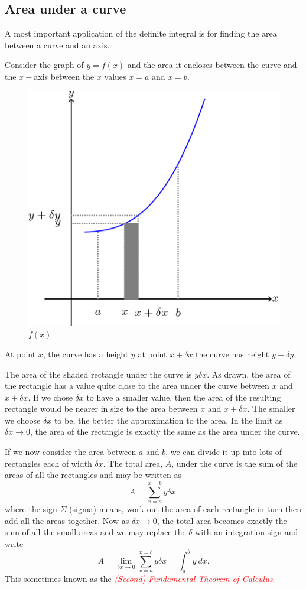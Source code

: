 \documentclass[
  11pt,
  oneside]{book}
\newcommand{\slide}{}
\theoremstyle{definition}
\theoremstyle{definition}
\theoremstyle{definition}
\theoremstyle{definition}
\theoremstyle{remark}
\begin{document}
\slide

\subsection{Area under a curve}\label{area-under-a-curve}

A most important application of the definite integral is for finding the area between a curve and an axis.

Consider the graph of \(y = f(x)\) and the area it encloses between the curve and the \(x-\)axis between the \(x\) values \(x = a\) and \(x = b\).

\begin{figure}

{\centering \includegraphics[width=0.4\linewidth]{tikztopng-figure20} 

}

\caption{$f(x)$}\label{fig:unnamed-chunk-42}
\end{figure}

At point \(x\), the curve has a height \(y\) at point \(x + \delta x\) the curve has height \(y + \delta y\).

The area of the shaded rectangle under the curve is \(y\delta x\). As drawn, the area of the rectangle has a value quite close to the area under the curve between \(x\) and \(x + \delta x\). If we chose \(\delta x\) to have a smaller value, then the area of the resulting rectangle would be nearer in size to the area between \(x\) and \(x + \delta x\). The smaller we choose \(\delta x\) to be, the better the approximation to the area. In the limit as \(\delta x \to 0\), the area of the rectangle is exactly the same as the area under the curve.

\slide

If we now consider the area between \(a\) and \(b\), we can divide it up into lots of rectangles each of width \(\delta x\). The total area, \(A\), under the curve is the sum of the areas of all the rectangles and may be written as
\[
A=\sum_{x=a}^{x=b}y\delta x.
\]
where the sign \(\Sigma\) (sigma) means, work out the area of each rectangle in turn then add all the areas together. Now as \(\delta x \to 0\), the total area becomes exactly the sum of all the small areas and we may replace the \(\delta\) with an integration sign and write
\[
A =\lim\limits_{\delta x\to 0}\sum_{x=a}^{x=b}y\delta x = \int_a^b y\ dx.
\]
This sometimes known as the \textcolor{red}{\em (Second) Fundamental Theorem of Calculus}.
\slide
\end{document}
